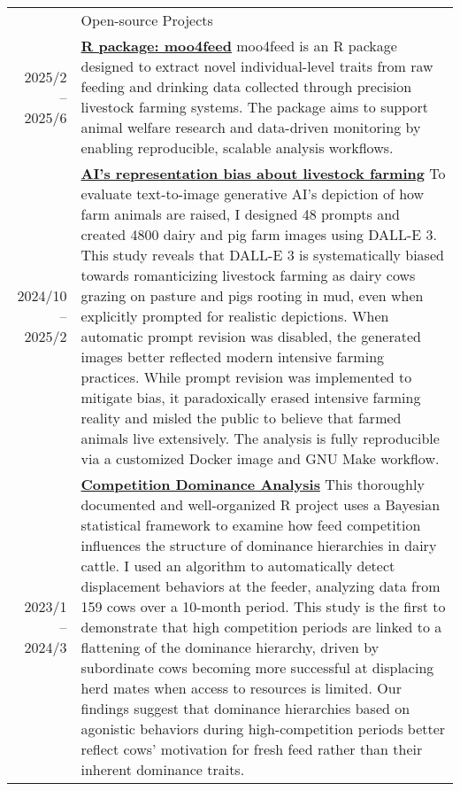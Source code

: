 \documentclass[letterpaper, 11pt]{article}
\newcommand{\socialicon}[1]{\raisebox{-0.05em}{\resizebox{!}{1em}{#1}}}
\newcommand{\headingfont}{\Large\color{OliveGreen}}
\newenvironment{SectionTable}[1]{
	\renewcommand*{\arraystretch}{1.7}
	\setlength{\tabcolsep}{10pt}
	\begin{longtable}{Rp{5.2in}} & #1 \\}
{\end{longtable}\vspace{-.3cm}}
\begin{document}
\begin{SectionTable}{\headingfont Open-source Projects}
2025/2 -- 2025/6 &
\textbf{\href{https://skysheng7.github.io/moo4feed/}{R package: moo4feed}} \socialicon{\faGithub}  \newline
moo4feed is an R package designed to extract novel individual-level traits from raw feeding and drinking data collected through precision livestock farming systems. The package aims to support animal welfare research and data-driven monitoring by enabling reproducible, scalable analysis workflows. \\
2024/10 -- 2025/2 &
\textbf{\href{https://github.com/skysheng7/AI_bias_in_farming.git}{AI's representation bias about livestock farming}} \socialicon{\faGithub}  \newline
To evaluate text-to-image generative AI's depiction of how farm animals are raised, I designed 48 prompts and created 4800 dairy and pig farm images using DALL-E 3. This study reveals that DALL-E 3 is systematically biased towards romanticizing livestock farming as dairy cows grazing on pasture and pigs rooting in mud, even when explicitly prompted for realistic depictions. When automatic prompt revision was disabled, the generated images better reflected modern intensive farming practices. While prompt revision was implemented to mitigate bias, it paradoxically erased intensive farming reality and misled the public to believe that farmed animals live extensively. The analysis is fully reproducible via a customized Docker image and GNU Make workflow. \\
2023/1 -- 2024/3 &
\textbf{\href{https://github.com/skysheng7/competition_dominance_analysis}{Competition Dominance Analysis}} \socialicon{\faGithub}  \newline
This thoroughly documented and well-organized R project uses a Bayesian statistical framework to examine how feed competition influences the structure of dominance hierarchies in dairy cattle. I used an algorithm to automatically detect displacement behaviors at the feeder, analyzing data from 159 cows over a 10-month period. This study is the first to demonstrate that high competition periods are linked to a flattening of the dominance hierarchy, driven by subordinate cows becoming more successful at displacing herd mates when access to resources is limited. Our findings suggest that dominance hierarchies based on agonistic behaviors during high-competition periods better reflect cows’ motivation for fresh feed rather than their inherent dominance traits. \\

\end{SectionTable}
\end{document}
